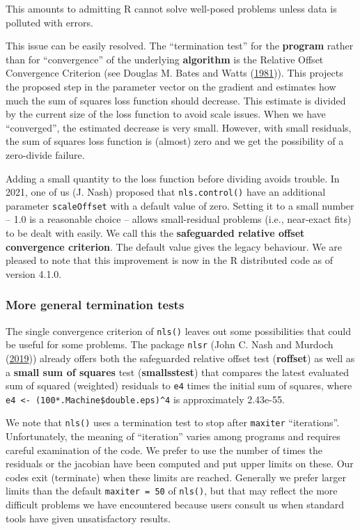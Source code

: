 \documentclass[
]{article}
\begin{document}
This amounts to admitting R cannot solve well-posed problems unless data
is polluted with errors.

This issue can be easily resolved. The ``termination test'' for the
\textbf{program} rather than for ``convergence'' of the underlying
\textbf{algorithm} is the Relative Offset Convergence Criterion (see
Douglas M. Bates and Watts
(\protect\hyperlink{ref-BatesWatts81}{1981})). This projects the
proposed step in the parameter vector on the gradient and estimates how
much the sum of squares loss function should decrease. This estimate is
divided by the current size of the loss function to avoid scale issues.
When we have ``converged'', the estimated decrease is very small.
However, with small residuals, the sum of squares loss function is
(almost) zero and we get the possibility of a zero-divide failure.

Adding a small quantity to the loss function before dividing avoids
trouble. In 2021, one of us (J. Nash) proposed that
\texttt{nls.control()} have an additional parameter \texttt{scaleOffset}
with a default value of zero. Setting it to a small number -- 1.0 is a
reasonable choice -- allows small-residual problems (i.e., near-exact
fits) to be dealt with easily. We call this the \textbf{safeguarded
relative offset convergence criterion}. The default value gives the
legacy behaviour. We are pleased to note that this improvement is now in
the R distributed code as of version 4.1.0.

\hypertarget{more-general-termination-tests}{%
\subsubsection{More general termination
tests}\label{more-general-termination-tests}}

The single convergence criterion of \texttt{nls()} leaves out some
possibilities that could be useful for some problems. The package
\texttt{nlsr} (John C. Nash and Murdoch
(\protect\hyperlink{ref-nlsr-manual}{2019})) already offers both the
safeguarded relative offset test (\textbf{roffset}) as well as a
\textbf{small sum of squares} test (\textbf{smallsstest}) that compares
the latest evaluated sum of squared (weighted) residuals to \texttt{e4}
times the initial sum of squares, where
\texttt{e4\ \textless{}-\ (100*.Machine\$double.eps)\^{}4} is
approximately 2.43e-55.

We note that \texttt{nls()} uses a termination test to stop after
\texttt{maxiter} ``iterations''. Unfortunately, the meaning of
``iteration'' varies among programs and requires careful examination of
the code. We prefer to use the number of times the residuals or the
jacobian have been computed and put upper limits on these. Our codes
exit (terminate) when these limits are reached. Generally we prefer
larger limits than the default \texttt{maxiter\ =\ 50} of
\texttt{nls()}, but that may reflect the more difficult problems we have
encountered because users consult us when standard tools have given
unsatisfactory results.
\end{document}
